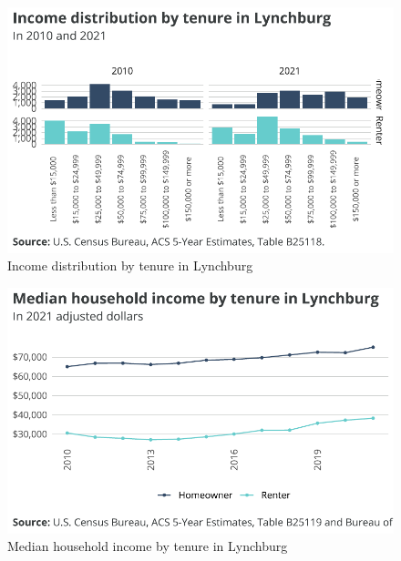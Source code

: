 \documentclass[
  letterpaper,
  DIV=11,
  numbers=noendperiod]{scrreprt}
\begin{document}
\begin{figure}[H]

{\centering \includegraphics{./part-3-3_files/figure-pdf/fig-inc-dist-1.pdf}

}

\caption{\label{fig-inc-dist}Income distribution by tenure in Lynchburg}

\end{figure}

\begin{figure}[H]

{\centering \includegraphics{./part-3-3_files/figure-pdf/fig-med-inc-1.pdf}

}

\caption{\label{fig-med-inc}Median household income by tenure in
Lynchburg}

\end{figure}
\end{document}
